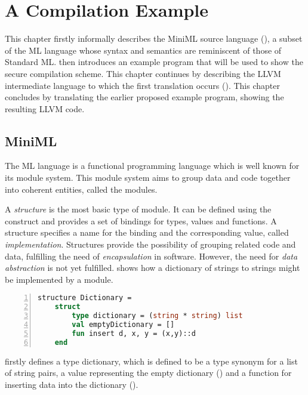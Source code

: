 \chapter{A Compilation Example}
\label{chap:ACompilationExample}
This chapter firstly informally describes the \mbox{MiniML} source language (), a subset of the ML language whose syntax and semantics are reminiscent of those of Standard ML.
 then introduces an example program that will be used to show the secure compilation scheme.
This chapter continues by describing the LLVM intermediate language to which the first translation occurs ().
This chapter concludes by translating the earlier proposed example program, showing the resulting LLVM code.

\section{MiniML}
\label{sec:MiniML}
The ML language is a functional programming language which is well known for its module system.
This module system aims to group data and code together into coherent entities, called the modules.

A \emph{structure} is the most basic type of module.
It can be defined using the  construct and provides a set of bindings for types, values and functions.
A structure specifies a name for the binding and the corresponding value, called \emph{implementation}.
Structures provide the possibility of grouping related code and data, fulfilling the need of \emph{encapsulation} in software.
However, the need for \emph{data abstraction} is not yet fulfilled.
 shows how a dictionary of strings to strings might be implemented by a module.
~
\begin{lstlisting}[frame=single, language=ML,caption={[Dictionary Definition Example]An example structure showing the definition of a dictionary in ML.}, label=code:DictionaryStructureExample,numbers=left]
structure Dictionary =
    struct
        type dictionary = (string * string) list
        val emptyDictionary = []
        fun insert d, x, y = (x,y)::d
    end
\end{lstlisting}

 firstly defines a type dictionary, which is defined to be a type synonym for a list of string pairs, a value representing the empty dictionary () and a function for inserting data into the dictionary ().

